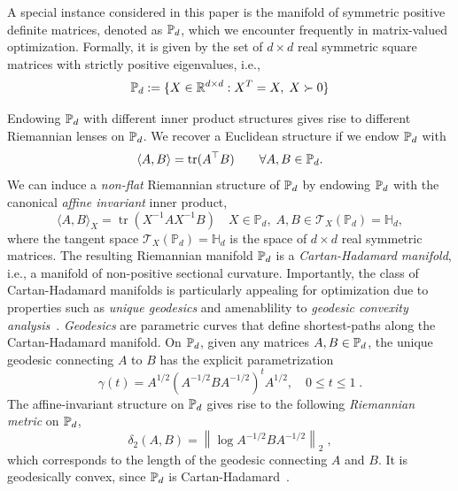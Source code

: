 \documentclass[twoside,11pt]{article}
\begin{document}
A special instance considered in this paper is the manifold of symmetric positive definite matrices, denoted as $\mathbb{P}_d$, which we encounter frequently in matrix-valued optimization. Formally, it is given by the set of $d \times d$ real symmetric square matrices with strictly positive eigenvalues, i.e., 
\begin{equation*}
    \mathbb{P}_d := \{ X \in \mathbb{R}^{d\times d}: X^T=X, \; X \succ 0 \}
\end{equation*}

Endowing $\mathbb{P}_d$ with different inner product structures gives rise to different Riemannian lenses on $\mathbb{P}_d$. We recover a Euclidean structure if we endow $\mathbb{P}_d$ with 
\[
\langle A, B \rangle = \text{tr}(A^\top B) \qquad \forall A,B \in \mathbb{P}_d.
\]
We can induce a \textit{non-flat} Riemannian structure of $\mathbb{P}_d$ by endowing $\mathbb{P}_d$ with the canonical \textit{affine invariant} inner product, 
\[\langle A, B\rangle_X=\operatorname{tr}\left(X^{-1} A X^{-1} B\right) \quad X \in \mathbb{P}_d, \; A, B \in \mathcal{T}_X\left(\mathbb{P}_d\right)=\mathbb{H}_d,\]
where the tangent space $\mathcal{T}_X\left(\mathbb{P}_d\right)=\mathbb{H}_d$ is the space of $d\times d$ real symmetric matrices. The resulting Riemannian manifold $\mathbb{P}_d$ is a \emph{Cartan-Hadamard manifold}, i.e., a manifold of non-positive sectional curvature. Importantly, the class of Cartan-Hadamard manifolds is particularly appealing for optimization due to properties such as \textit{unique geodesics} and amenablility to \textit{geodesic convexity analysis}~\citep{bacak2014convex}. 
\emph{Geodesics} are parametric curves that define shortest-paths along the Cartan-Hadamard manifold. On $\mathbb{P}_d$, given any matrices $A,B \in \mathbb{P}_d$, the unique geodesic connecting $A$ to $B$ has the explicit parametrization
\begin{equation}\label{eq:intro_gcvx_def}
    \gamma(t)=A^{1 / 2}\left(A^{-1 / 2} B A^{-1 / 2}\right)^t A^{1 / 2}, \quad 0 \leq t \leq 1 \; .
\end{equation}
The affine-invariant structure on $\mathbb{P}_d$ gives rise to the following \textit{Riemannian metric} on $\mathbb{P}_d$, 
\[
\delta_2(A, B)=\left\|\log A^{-1 / 2} B A^{-1 / 2}\right\|_2 \; ,
\]
which corresponds to the length of the geodesic connecting $A$ and $B$. It is geodesically convex, since $\mathbb{P}_d$ is Cartan-Hadamard~\citep{bacak2014convex, bhatia07positivedefinitematrices}.
\end{document}

